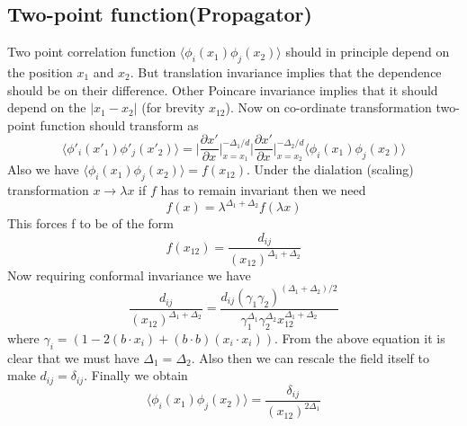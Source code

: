 \documentclass[12pt,a4paper,oneside]{book}
\theoremstyle{definition}
\begin{document}
    \subsection{Two-point function(Propagator)}\label{propagator}
        Two point correlation function $\langle\phi_{i}(x_1)\phi_{j}(x_2)\rangle$ should in principle depend on the position $x_1$ and $x_2$. But translation invariance implies that the dependence should be on their difference. Other Poincare invariance implies that it should depend on the $\lvert x_1 - x_2 \rvert$ (for brevity $x_{12}$). Now on co-ordinate transformation two-point function should transform as
        \begin{equation}
            \langle\phi'_{i}(x'_1)\phi'_{j}(x'_2)\rangle = \bigg\lvert \frac{\partial x'}{\partial x} \bigg\rvert_{x=x_1}^{-\Delta_{1}/d} \bigg\lvert \frac{\partial x'}{\partial x} \bigg\rvert_{x=x_2}^{-\Delta_{2}/d} \langle\phi_{i}(x_1)\phi_{j}(x_2)\rangle 
        \end{equation}
        Also we have $\langle\phi_{i}(x_1)\phi_{j}(x_2)\rangle = f(x_{12})$. Under the dialation (scaling) transformation $x\rightarrow \lambda x$ if $f$ has to remain invariant then we need
        \begin{equation}
            f(x) = \lambda^{\Delta_1 + \Delta_2} f(\lambda x)
        \end{equation} 
        This forces f to be of the form 
        \begin{equation}
            f(x_{12}) = \frac{d_{ij}}{(x_{12})^{\Delta_1 + \Delta_2}}
        \end{equation}
        Now requiring conformal invariance we have
        \begin{equation}
            \frac{d_{ij}}{(x_{12})^{\Delta_1 + \Delta_2}} = \frac{d_{ij}(\gamma_1\gamma_2)^{(\Delta_1+\Delta_2)/2}}{\gamma_1^{\Delta_1}\gamma_2^{\Delta_2}x_{12}^{\Delta_1 + \Delta_2}}
        \end{equation}
        where $\gamma_i = (1-2(b\cdot x_i)+(b\cdot b)(x_i \cdot x_i))$. From the above equation it is clear that we must have $\Delta_1 = \Delta_2$. Also then we can rescale the field itself to make $d_{ij} = \delta_{ij}$. Finally we obtain 
        \begin{equation}
            \langle\phi_{i}(x_1)\phi_{j}(x_2)\rangle = \frac{\delta_{ij}}{(x_{12})^{2\Delta_1}}
        \end{equation}
\end{document}
